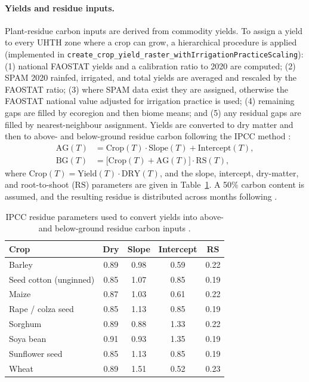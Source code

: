 \documentclass[11pt]{article}
\begin{document}
\paragraph{Yields and residue inputs.} Plant-residue carbon inputs are derived from
commodity yields. To assign a yield to every UHTH zone where a crop can grow, a
hierarchical procedure is applied (implemented in
\texttt{create\_crop\_yield\_raster\_withIrrigationPracticeScaling}): (1) national
FAOSTAT yields and a calibration ratio to 2020 are computed; (2) SPAM 2020 rainfed,
irrigated, and total yields are averaged and rescaled by the FAOSTAT ratio; (3) where
SPAM data exist they are assigned, otherwise the FAOSTAT national value adjusted for
irrigation practice is used; (4) remaining gaps are filled by ecoregion and then biome
means; and (5) any residual gaps are filled by nearest-neighbour assignment. Yields are
converted to dry matter and then to above- and below-ground residue carbon following the
IPCC method \citep{ipcc2006,ipcc2019}:
\begin{align}
\mathrm{AG}(T) &= \mathrm{Crop}(T)\cdot \mathrm{Slope}(T) + \mathrm{Intercept}(T), \\
\mathrm{BG}(T) &= \big[\mathrm{Crop}(T) + \mathrm{AG}(T)\big]\cdot \mathrm{RS}(T),
\end{align}
where $\mathrm{Crop}(T)=\mathrm{Yield}(T)\cdot\mathrm{DRY}(T)$, and the slope,
intercept, dry-matter, and root-to-shoot ($\mathrm{RS}$) parameters are given in
Table~\ref{tab:residues}. A 50\% carbon content is assumed, and the resulting residue
is distributed across months following \citet{morais2019}.

\begin{table}[t]
\centering
\caption{IPCC residue parameters used to convert yields into above- and below-ground
residue carbon inputs \citep{ipcc2006,ipcc2019}.}
\label{tab:residues}
\small
\begin{tabular}{@{}lcccc@{}}
\toprule
Crop & Dry & Slope & Intercept & RS \\
\midrule
Barley & 0.89 & 0.98 & 0.59 & 0.22 \\
Seed cotton (unginned) & 0.85 & 1.07 & 0.85 & 0.19 \\
Maize & 0.87 & 1.03 & 0.61 & 0.22 \\
Rape / colza seed & 0.85 & 1.13 & 0.85 & 0.19 \\
Sorghum & 0.89 & 0.88 & 1.33 & 0.22 \\
Soya bean & 0.91 & 0.93 & 1.35 & 0.19 \\
Sunflower seed & 0.85 & 1.13 & 0.85 & 0.19 \\
Wheat & 0.89 & 1.51 & 0.52 & 0.23 \\
\bottomrule
\end{tabular}
\end{table}
\end{document}
